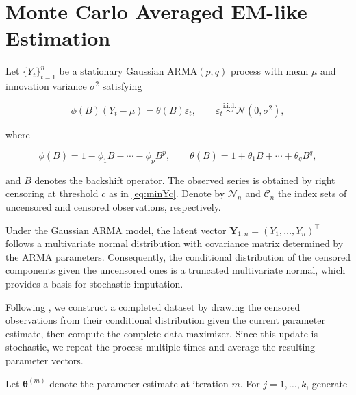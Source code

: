 \documentclass[10pt,twoside]{article}
\numberwithin{equation}{section}
\begin{document}
\section{Monte Carlo Averaged EM-like Estimation}

\label{sec:method}

Let $\{Y_t\}_{t=1}^n$ be a stationary Gaussian ARMA$(p,q)$ process with mean $\mu$ and innovation variance $\sigma^2$ satisfying

\begin{equation*}

\phi(B)(Y_t-\mu)=\theta(B)\varepsilon_t,

\qquad

\varepsilon_t \stackrel{\text{i.i.d.}}{\sim} \mathcal{N}(0,\sigma^2),

\end{equation*}

where

\begin{equation*}

\phi(B)=1-\phi_1B-\cdots-\phi_pB^p,

\qquad

\theta(B)=1+\theta_1B+\cdots+\theta_qB^q,

\end{equation*}

and $B$ denotes the backshift operator. The observed series is obtained by right censoring at threshold $c$ as in \eqref{eq:minYc}. Denote by $\mathcal{N}_n$ and $\mathcal{C}_n$ the index sets of uncensored and censored observations, respectively.



Under the Gaussian ARMA model, the latent vector $\mathbf{Y}_{1:n} = (Y_1,\ldots,Y_n)^\top$ follows a multivariate normal distribution with covariance matrix determined by the ARMA parameters. Consequently, the conditional distribution of the censored components given the uncensored ones is a truncated multivariate normal, which provides a basis for stochastic imputation.



Following \citet{park2007}, we construct a completed dataset by drawing the censored observations from their conditional distribution given the current parameter estimate, then compute the complete-data maximizer. Since this update is stochastic, we repeat the process multiple times and average the resulting parameter vectors.



Let $\boldsymbol{\theta}^{(m)}$ denote the parameter estimate at iteration $m$. For $j=1,\ldots,k$, generate
\end{document}
